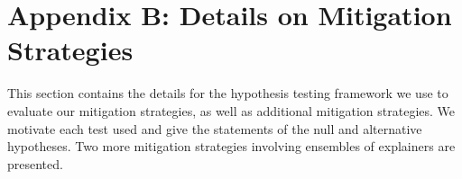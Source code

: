 \documentclass[12pt]{article}  %
\begin{document}
    
    
    
   

    
    
    
    
    
    
   
    
    
    \section*{Appendix B: Details on Mitigation Strategies}
        \label{apx_sec:mitigation_details}
        This section contains the details for the hypothesis testing framework we use to evaluate our mitigation strategies, as well as additional mitigation strategies. We motivate each test used and give the statements of the null and alternative hypotheses. Two more mitigation strategies involving ensembles of explainers are presented. 
        
\end{document}
